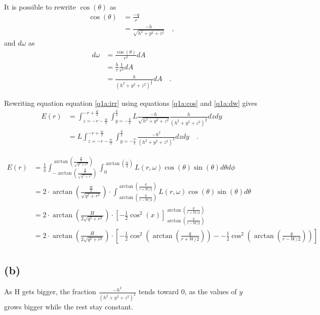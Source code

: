 \documentclass{report}
\begin{document}
It is possible to rewrite $\cos(\theta)$ as
\begin{align}
\cos(\theta)  &= \frac{-q}{r} \\
              &= \frac{-h}{\sqrt{h^2 + y^2 + z^2}}
\quad,
\label{q1a:cos}
\end{align}
and $d\omega$ as
\begin{align}
d\omega &= \frac{\cos(\theta)}{r^2} dA \\
        &= \frac{h}{r} \frac{1}{r^2} dA \\
        &= \frac{h}{\left(h^2 + y^2 + z^2\right)^\frac{3}{2}} dA
\quad.
\label{q1a:dw}
\end{align}

Rewriting equation equation \eqref{q1a:irr} using equations \eqref{q1a:cos} and \eqref{q1a:dw} gives
\begin{align}
E(r) &= \int_{z= -r - \frac{w}{2}}^{-r+\frac{w}{2}} \int_{y= - \frac{q}{2}}^{\frac{q}{2}} L \frac{-h}{\sqrt{h^2 + y^2 + z^2}} \frac{h}{\left(h^2 + y^2 + z^2\right)^\frac{3}{2}} dzdy \\
     &= L \int_{z= -r - \frac{w}{2}}^{-r+\frac{w}{2}} \int_{y= - \frac{q}{2}}^{\frac{q}{2}} \frac{-h^2}{\left(h^2 + y^2 + z^2\right)^2} dzdy
\quad.
\end{align}


\begin{align*}
E(r) &= \frac{1}{\pi} \int_{-\arctan(\frac{\frac{H}{2}}{\sqrt{q^2+r^2}})}^{\arctan(\frac{\frac{H}{2}}{\sqrt{q^2+r^2}})} \int_{0}^{\arctan(\frac{w}{q})} L(r,\omega)\cos(\theta) \sin(\theta) d\theta d\phi \\
     &= 2 \cdot \arctan(\frac{\frac{H}{2}}{\sqrt{q^2+r^2}}) \cdot \int_{\arctan(\frac{q}{r-W/2})}^{\arctan(\frac{q}{r+W/2})} L(r,\omega)\cos(\theta) \sin(\theta) d\theta \\
     &= 2 \cdot \arctan(\frac{H}{2\sqrt{q^2+r^2}}) \cdot \left[ - \frac{1}{2} \cos^2(x) \right]_{\arctan(\frac{q}{r-W/2})}^{\arctan(\frac{q}{r+W/2})} \\
     &= 2 \cdot \arctan(\frac{H}{2\sqrt{q^2+r^2}}) \cdot \left[ - \frac{1}{2} \cos^2(\arctan(\frac{q}{r+W/2})) - - \frac{1}{2} \cos^2(\arctan(\frac{q}{r-W/2})) \right] \\
\end{align*}

\subsection{(b)}

As H gets bigger, the fraction $\frac{-h^2}{\left(h^2 + y^2 + z^2\right)^2}$ tends toward $0$, as the values of $y$ grows bigger while the rest stay constant.
\end{document}
